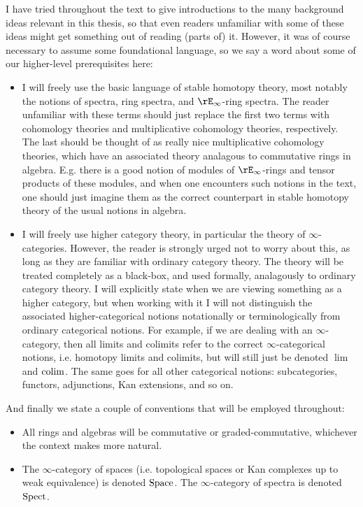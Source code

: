 I have tried throughout the text to give introductions to the many
background ideas relevant in this thesis, so that even readers
unfamiliar with some of these ideas might get something out of reading
(parts of) it. However, it was of course necessary to assume some
foundational language, so we say a word about some of our higher-level
prerequisites here:
\begin{itemize}
\item I will freely use the basic language of stable homotopy theory,
  most notably the notions of spectra, ring spectra, and
  $\rE_\infty$-ring spectra. The reader unfamiliar with these terms
  should just replace the first two terms with cohomology theories and
  multiplicative cohomology theories, respectively. The last should be
  thought of as really nice multiplicative cohomology theories, which
  have an associated theory analagous to commutative rings in algebra.
  E.g. there is a good notion of modules of $\rE_\infty$-rings and
  tensor products of these modules, and when one encounters such
  notions in the text, one should just imagine them as the correct
  counterpart in stable homotopy theory of the usual notions in
  algebra.
\item I will freely use higher category theory, in particular the
  theory of $\infty$-categories. However, the reader is strongly urged
  not to worry about this, as long as they are familiar with ordinary
  category theory. The theory will be treated completely as a
  black-box, and used formally, analagously to ordinary category
  theory. I will explicitly state when we are viewing something as a
  higher category, but when working with it I will not distinguish the
  associated higher-categorical notions notationally or
  terminologically from ordinary categorical notions. For example, if
  we are dealing with an $\infty$-category, then all limits and
  colimits refer to the correct $\infty$-categorical notions,
  i.e. homotopy limits and colimits, but will still just be denoted
  $\lim$ and $\operatorname*{colim}$. The same goes for all other categorical
  notions: subcategories, functors, adjunctions, Kan extensions, and
  so on.
\end{itemize}

And finally we state a couple of conventions that will be employed
throughout:
\begin{itemize}
\item All rings and algebras will be commutative or
  graded-commutative, whichever the context makes more natural.
\item The $\infty$-category of spaces (i.e. topological spaces or Kan
  complexes up to weak equivalence) is denoted $\mathrm{Space}$. The
  $\infty$-category of spectra is denoted $\mathrm{Spect}$.
\end{itemize}


